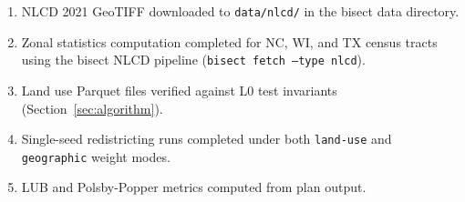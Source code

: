 \begin{enumerate}
  \item NLCD 2021 GeoTIFF downloaded to \texttt{data/nlcd/} in the
    bisect data directory.
  \item Zonal statistics computation completed for NC, WI, and TX census
    tracts using the bisect NLCD pipeline (\texttt{bisect fetch --type nlcd}).
  \item Land use Parquet files verified against L0 test invariants
    (Section~\ref{sec:algorithm}).
  \item Single-seed redistricting runs completed under both
    \texttt{land-use} and \texttt{geographic} weight modes.
  \item LUB and Polsby-Popper metrics computed from plan output.
\end{enumerate}

